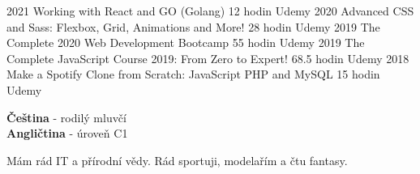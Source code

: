 \documentclass[9pt]{developercv} %
\begin{document}
\begin{entrylist}
	\entry
		{2021}
		{Working with React and GO (Golang)}
		{12 hodin}
		{Udemy}
	\entry
		{2020}
		{Advanced CSS and Sass: Flexbox, Grid, Animations and More!}
		{28 hodin}
		{Udemy}
	\entry
		{2019}
		{The Complete 2020 Web Development Bootcamp}
		{55 hodin}
		{Udemy}
	\entry
		{2019}
		{The Complete JavaScript Course 2019: From Zero to Expert!}
		{68.5 hodin}
		{Udemy}
	\entry
		{2018}
		{Make a Spotify Clone from Scratch: JavaScript PHP and MySQL}
		{15 hodin}
		{Udemy}
\end{entrylist}


\begin{minipage}[t]{0.5\textwidth}
	\vspace{-\baselineskip} %

	
	\textbf{Čeština} - rodilý mluvčí\\
	\textbf{Angličtina} - úroveň C1
\end{minipage}
\hfill
\begin{minipage}[t]{0.5\textwidth}
	\vspace{-\baselineskip} %
	
	
	Mám rád IT a přírodní vědy. Rád sportuji, modelařím a čtu fantasy.
\end{minipage}
\hfill

\end{document}
